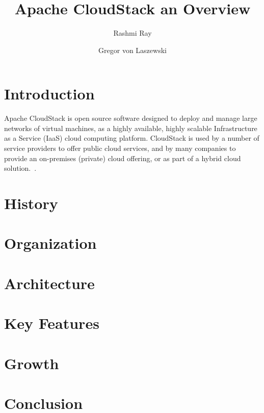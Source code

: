 
\title{Apache CloudStack an Overview}


\author{Rashmi Ray}

\author{Gregor von Laszewski}


\renewcommand{\shortauthors}{G. v. Laszewski}


\begin{abstract}

\end{abstract}


\maketitle

\section{Introduction}
Apache CloudStack is open source software designed to deploy and manage large networks of 
virtual machines, as a highly available, highly scalable Infrastructure as a Service (IaaS)
cloud computing platform. CloudStack is used by a number of service providers to offer public 
cloud services, and by many companies to provide an on-premises (private) cloud offering, 
or as part of a hybrid cloud solution.~\cite{hid-sp18-417-www-cloudstack-intro}. 

\section{History}

\section{Organization}

\section{Architecture}

\section{Key Features}

\section{Growth}

\section{Conclusion}


 
